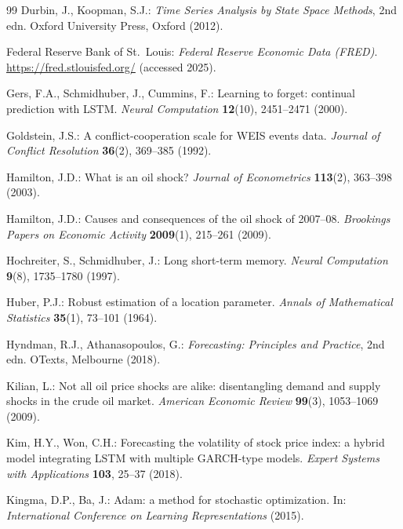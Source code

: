 \documentclass[12pt,a4paper]{article}
\begin{document}
\begin{thebibliography}{99}
Durbin, J., Koopman, S.J.: \emph{Time Series Analysis by State Space Methods}, 2nd edn.
Oxford University Press, Oxford (2012).

Federal Reserve Bank of St.\ Louis: \emph{Federal Reserve Economic Data (FRED)}.
\url{https://fred.stlouisfed.org/} (accessed 2025).

Gers, F.A., Schmidhuber, J., Cummins, F.: Learning to forget: continual prediction with LSTM.
\emph{Neural Computation} \textbf{12}(10), 2451--2471 (2000).

Goldstein, J.S.: A conflict-cooperation scale for WEIS events data.
\emph{Journal of Conflict Resolution} \textbf{36}(2), 369--385 (1992).

Hamilton, J.D.: What is an oil shock?
\emph{Journal of Econometrics} \textbf{113}(2), 363--398 (2003).

Hamilton, J.D.: Causes and consequences of the oil shock of 2007--08.
\emph{Brookings Papers on Economic Activity} \textbf{2009}(1), 215--261 (2009).

Hochreiter, S., Schmidhuber, J.: Long short-term memory.
\emph{Neural Computation} \textbf{9}(8), 1735--1780 (1997).

Huber, P.J.: Robust estimation of a location parameter.
\emph{Annals of Mathematical Statistics} \textbf{35}(1), 73--101 (1964).

Hyndman, R.J., Athanasopoulos, G.: \emph{Forecasting: Principles and Practice}, 2nd edn.
OTexts, Melbourne (2018).

Kilian, L.: Not all oil price shocks are alike: disentangling demand and supply shocks in the crude oil market.
\emph{American Economic Review} \textbf{99}(3), 1053--1069 (2009).

Kim, H.Y., Won, C.H.: Forecasting the volatility of stock price index: a hybrid model integrating LSTM with multiple GARCH-type models.
\emph{Expert Systems with Applications} \textbf{103}, 25--37 (2018).

Kingma, D.P., Ba, J.: Adam: a method for stochastic optimization.
In: \emph{International Conference on Learning Representations} (2015).


\end{thebibliography}
\end{document}
